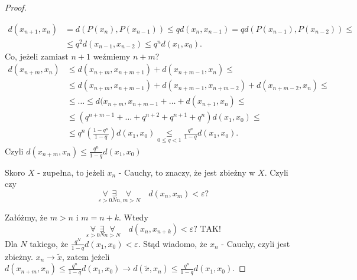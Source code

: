 \documentclass[../main.tex]{subfiles}
\begin{document}
\begin{proof}
\begin{obserwacja}


\begin{align*}
    d(x_{n+1},x_n) &= d(P(x_n),P(x_{n-1})) \leq qd(x_n, x_{n-1}) = qd(P(x_{n-1}),P(x_{n-2})) \leq\\
    &\leq q^2 d(x_{n-1},x_{n-2}) \leq q^n d(x_1,x_0)
.\end{align*}
Co, jeżeli zamiast $n+1$ weźmiemy $n+m$?
\begin{align*}
    d(x_{n+m},x_n) &\leq d(x_{n+m},x_{n+m+1}) + d(x_{n+m-1},x_n) \leq\\
    &\leq d(x_{n+m},x_{n+m-1}) + d(x_{n+m-1},x_{n+m-2}) + d(x_{n+m-2},x_n)\leq\\
    &\leq \dots\leq d(x_{n+m},x_{n+m-1}+ \dots+d(x_{n+1},x_n)\leq \\
    &\leq (q^{n+m-1} + \dots + q^{n+2} + q^{n+1} + q^n)d(x_1,x_0) \leq\\
    &\leq q^n \left ( \frac{1-q^n}{1-q} \right ) d(x_1,x_0) \underset{0\leq q<1}{\leq} \frac{q^n}{1-q} d(x_1,x_0)
.\end{align*}
Czyli $d(x_{n+m},x_n) \leq \frac{q^n}{1-q} d(x_1,x_0)$\\
\end{obserwacja}

Skoro $X$ - zupełna, to jeżeli $x_n$ - Cauchy, to znaczy, że jest zbieżny w $X$.
Czyli czy
$$\underset{\varepsilon>0}{\forall}\underset{N}{\exists}\underset{n,m>N}{\forall}\quad d(x_n,x_m) <\varepsilon ?$$

Załóżmy, że $m>n$ i $m=n+k$. Wtedy
$$\underset{\varepsilon>0}{\forall}\underset{N}{\exists}\underset{n>N}{\forall}\quad d(x_n,x_{n+k}) < \varepsilon? \text{ TAK!}$$
Dla $N$ takiego, że $\frac{q^N}{1-q} d(x_1,x_0) < \varepsilon$. Stąd wiadomo, że $x_n$ - Cauchy, czyli jest zbieżny. $x_n \to \tilde x$, zatem jeżeli $d(x_{n+m},x_n)\leq \frac{q^n}{1-q} d(x_1,x_0) \rightarrow d(\tilde x,x_n) \leq \frac{q^n}{1-q} d(x_1,x_0).$
\end{proof}
\end{document}
